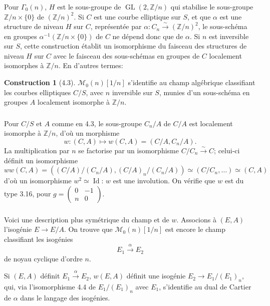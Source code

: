 \documentclass[11pt,a4paper]{amsart}
\theoremstyle{plain}
\theoremstyle{definition}
\newtheorem{construction}[theorem]{Construction}
\DeclareMathOperator{\Gl}{GL}
\newcommand{\mll}{\mathcal{M}}
\DeclareMathOperator{\Id}{Id}
\newcommand{\ZZ}{\mathbb{Z}}
\begin{document}
\subsubsection{}
Pour $\Gamma_0(n)$, $H$ est le sous-groupe de $\Gl(2, \ZZ/n)$ qui stabilise le sous-groupe $\ZZ/n \times \{0\}$ de $(\ZZ/n)^2$. Si $C$ est une courbe elliptique sur $S$, et que $\alpha$ est une structure de niveau $H$ sur $C$, repr\'esent\'ee par $\alpha \colon C_n \xrightarrow{\sim} (\ZZ/n)^2$, le sous-sch\'ema en groupes $\alpha^{-1}(\ZZ/n \times \{0\})$ de $C$ ne d\'epend donc que de $\alpha$. Si $n$ est inversible sur $S$, cette construction \'etablit un isomorphisme du faisceau des structures de niveau $H$ sur $C$ avec le faisceau des sous-sch\'emas en groupes de $C$ localement isomorphes \`a $\ZZ/n$. En d'autres termes:

\begin{construction}[4.3]
$\mll_0(n)[1/n]$ s'identifie au champ alg\'ebrique classifiant les courbes elliptiques $C/S$, avec $n$ inversible sur $S$, munies d'un sous-sch\'ema en groupes $A$ localement isomorphe \`a $\ZZ/n$.
\end{construction}

\subsubsection{}
Pour $C/S$ et $A$ comme en 4.3, le sous-groupe $C_n/A$ de $C/A$ est localement isomorphe \`a $\ZZ/n$, d'o\`u un morphisme
\[
w \colon (C,A) \longmapsto w(C,A) = (C/A, C_n/A).
\]
La multiplication par $n$ se factorise par un isomorphisme $C/C_n \xrightarrow{\sim} C$; celui-ci d\'efinit un isomorphisme
\[
ww(C,A) = ((C/A)/(C_n/A), (C/A)_n/(C_n/A)) \simeq (C/C_n, \ldots) \simeq (C,A)
\]
d'o\`u un isomorphisme $w^2 \simeq \Id$: $w$ est une involution. On v\'erifie que $w$ est du type 3.16, pour $g = \begin{pmatrix} 0 & -1 \\ n & 0 \end{pmatrix}$.

\subsubsection{}
Voici une description plus sym\'etrique du champ et de $w$. Associons \`a $(E,A)$ l'isog\'enie $E \to E/A$. On trouve que $\mll_0(n)[1/n]$ est encore le champ classifiant les isog\'enies
\[
E_1 \xrightarrow{\alpha} E_2
\]
de noyau cyclique d'ordre $n$.

Si $(E,A)$ d\'efinit $E_1 \xrightarrow{\alpha} E_2$, $w(E,A)$ d\'efinit une isog\'enie $E_2 \to E_1/(E_1)_n$, qui, via l'isomorphisme 4.4 de $E_1/(E_1)_n$ avec $E_1$, s'identifie au dual de Cartier de $\alpha$ dans le langage des isog\'enies.
\end{document}
